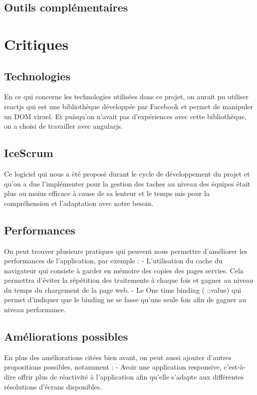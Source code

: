 \documentclass [a4paper,11pt]{article}
\begin{document}
\subsection{Outils complémentaires}

\newpage

\newpage

\section{Critiques}

\subsection{Technologies}
En ce qui concerne les technologies utilisées dans ce projet, on aurait pu utiliser reactjs qui est une bibliothèque développée par Facebook et permet de manipuler un DOM viruel. Et puisqu’on n’avait pas d’expériences avec cette bibliothèque, on a choisi de travailler avec angularjs.
\subsection{IceScrum}
Ce logiciel qui nous a été proposé durant le cycle de développement du projet et qu’on a due l’implémenter pour la gestion des taches au niveau des équipes était plus ou moins efficace à cause de sa lenteur et le temps mis pour la compréhension et l’adaptation avec notre besoin.


\subsection{Performances}
On peut trouver plusieurs pratiques qui peuvent nous permettre d’améliorer les performances de l’application, par exemple :\newline
-	L’utilisation du cache du navigateur qui consiste à garder en mémoire des copies des pages servies. Cela permettra d’éviter la répétition des traitements à chaque fois et gagner au niveau du temps du chargement de la page web.\newline
-	Le One time binding ( ::value) qui permet d’indiquer que le binding ne se fasse qu’une seule fois afin de gagner au niveau performance.
\subsection{Améliorations possibles}
En plus des améliorations citées bien avant, on peut aussi ajouter d’autres propositions possibles, notamment : \newline
-	Avoir une application responsive, c’est-à-dire offrir plus de réactivité à l’application afin qu’elle s’adapte aux différentes résolutions d’écrans disponibles.


\newpage

\nocite{*}


\end{document}
